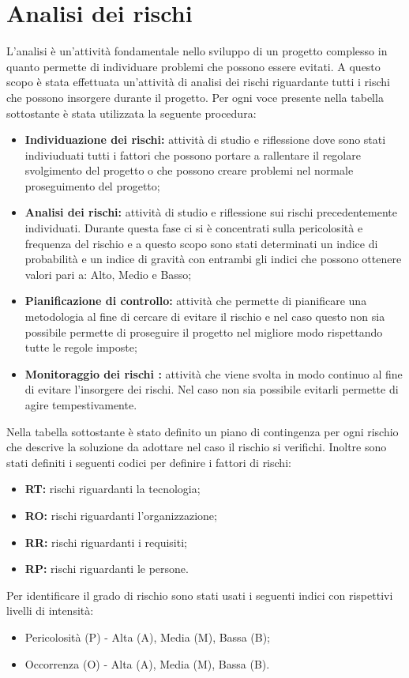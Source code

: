 \section{Analisi dei rischi}
L'analisi è un'attività fondamentale nello sviluppo di un progetto complesso in quanto permette di individuare problemi che possono essere evitati.
A questo scopo è stata effettuata un'attività di analisi dei rischi riguardante tutti i rischi che possono insorgere durante il progetto.
Per ogni voce presente nella tabella sottostante è stata utilizzata la seguente procedura:
\begin{itemize}
	\item \textbf{Individuazione dei rischi:} attività di studio e riflessione dove sono stati indiviuduati tutti i fattori che possono portare a rallentare il regolare svolgimento del progetto o che possono creare problemi nel normale proseguimento del progetto; \\
	\item \textbf{Analisi dei rischi:} attività di studio e riflessione sui rischi precedentemente individuati. Durante questa fase ci si è concentrati sulla pericolosità e frequenza del rischio e a questo scopo sono stati determinati un indice di probabilità e un indice di gravità con entrambi gli indici che possono ottenere valori pari a: Alto, Medio e Basso; \\
	\item \textbf{Pianificazione di controllo:} attività che permette di pianificare una metodologia al fine di cercare di evitare il rischio e nel caso questo non sia possibile permette di proseguire il progetto nel migliore modo rispettando tutte le regole imposte; \\
	\item \textbf{Monitoraggio dei rischi :} attività che viene svolta in modo continuo al fine di evitare l'insorgere dei rischi. Nel caso non sia possibile evitarli permette di agire tempestivamente. \\
\end{itemize}
Nella tabella sottostante è stato definito un piano di contingenza per ogni rischio che descrive la soluzione da adottare nel caso il rischio si verifichi.
Inoltre sono stati definiti i seguenti codici per definire i fattori di rischi:
\begin{itemize}
	\item \textbf{RT:} rischi riguardanti la tecnologia;
	\item \textbf{RO:} rischi riguardanti l'organizzazione;
	\item \textbf{RR:} rischi riguardanti i requisiti;
	\item \textbf{RP:} rischi riguardanti le persone.
\end{itemize}
Per identificare il grado di rischio sono stati usati i seguenti indici con rispettivi livelli di intensità:
\begin{itemize}
	\item Pericolosità (P) - Alta (A), Media (M), Bassa (B);
	\item Occorrenza (O) - Alta (A), Media (M), Bassa (B).
\end{itemize}

